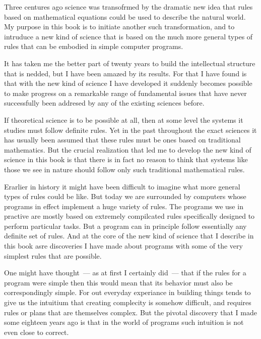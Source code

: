 
Three centures ago science was transofrmed by the dramatic new idea
that rules based on mathematical equations could be used to describe
the natural world.
My purpose in this book is to initiate another such
transformation, and to intruduce a new kind of science that is based on
the much more general types of rules that can be embodied in simple
computer programs.

It has taken me the better part of twenty years to build the
intellectual structure that is nedded, but I have been amazed by its
results. For that I have found is that with the new kind of science I
have developed it suddenly becomes possible to make progress on a
remarkable range of fundamental issues that have never successfully
been addresed by any of the existing sciences before.

If theoretical science is to be possible at all, then at some level
the systems it studies must follow definite rules. Yet in the past
throughout the exact sciences it has usually been assumed that these
rules must be ones based on traditional mathematics. But the crucial
realization that led me to develop the new kind of science in this book
is that there is in fact no reason to think that systems like those we see
in nature should follow only such traditional mathematical rules.

Erarlier in history it might have been difficult to imagine what
more general types of rules could be like. But today we are surrounded
by computers whose programs in effect implement a huge variety of
rules. The programs we use in practive are mostly based on extremely
compilcated rules specifically designed to perform particular tasks. But
a program can in principle follow essentially any definite set of rules.
And at the core of the new kind of science that I describe in this book
asre discoveries I have made about programs with some of the very
simplest rules that are possible.

One might have thought\ --- as at first I certainly did\ --- that if the
rules for a program were simple then this would mean that its behavior
must also be correspondingly simple. For out everyday experiance in
building things tends to give us the intuitium that creating complecity is
somehow difficult, and requires rules or plans that are themselves
complex. But the pivotal discovery that I made some eighteen years ago is
that in the world of programs such intuition is not even close to correct.

